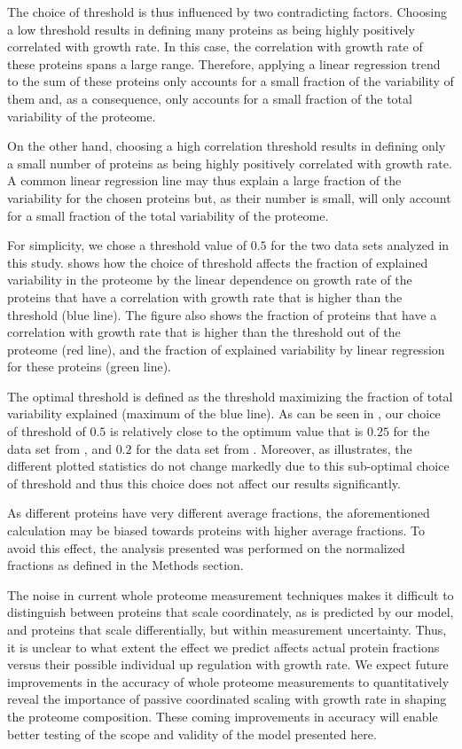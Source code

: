 \documentclass[10pt,letterpaper]{article}
\begin{document}
The choice of threshold is thus influenced by two contradicting factors.
Choosing a low threshold results in defining many proteins as being highly positively correlated with growth rate.
In this case, the correlation with growth rate of these proteins spans a large range.
Therefore, applying a linear regression trend to the sum of these proteins only accounts for a small fraction of the variability of them and, as a consequence, only accounts for a small fraction of the total variability of the proteome.

On the other hand, choosing a high correlation threshold results in defining only a small number of proteins as being highly positively correlated with growth rate.
A common linear regression line may thus explain a large fraction of the variability for the chosen proteins but, as their number is small, will only account for a small fraction of the total variability of the proteome.

For simplicity, we chose a threshold value of $0.5$ for the two data sets analyzed in this study.
 shows how the choice of threshold affects the fraction of explained variability in the proteome by the linear dependence on growth rate of the proteins that have a correlation with growth rate that is higher than the threshold (blue line).
The figure also shows the fraction of proteins that have a correlation with growth rate that is higher than the threshold out of the proteome (red line), and the fraction of explained variability by linear regression for these proteins (green line).

The optimal threshold is defined as the threshold maximizing the fraction of total variability explained (maximum of the blue line).
As can be seen in , our choice of threshold of $0.5$ is relatively close to the optimum value that is $0.25$ for the data set from \cite{Schmidt2015}, and $0.2$ for the data set from \cite{Peebo_2015}.
Moreover, as  illustrates, the different plotted statistics do not change markedly due to this sub-optimal choice of threshold and thus this choice does not affect our results significantly.

As different proteins have very different average fractions, the aforementioned calculation may be biased towards proteins with higher average fractions.
To avoid this effect, the analysis presented was performed on the normalized fractions as defined in the Methods section.

The noise in current whole proteome measurement techniques makes it difficult to distinguish between proteins that scale coordinately, as is predicted by our model, and proteins that scale differentially, but within measurement uncertainty.
Thus, it is unclear to what extent the effect we predict affects actual protein fractions versus their possible individual up regulation with growth rate.
We expect future improvements in the accuracy of whole proteome measurements to quantitatively reveal the importance of passive coordinated scaling with growth rate in shaping the proteome composition. These coming improvements in accuracy will enable better testing of the scope and validity of the model presented here.
\end{document}

